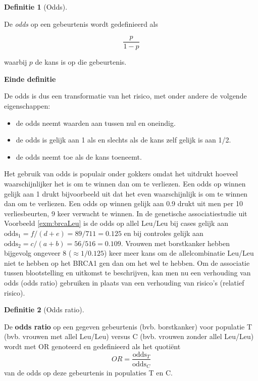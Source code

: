 \documentclass[
  12pt,dutch,coursenotes]{book}
\theoremstyle{definition}
\newtheorem{definition}{Definitie}[chapter]
\theoremstyle{definition}
\theoremstyle{definition}
\theoremstyle{definition}
\theoremstyle{remark}
\begin{document}
\begin{definition}[Odds]
\protect\hypertarget{def:unnamed-chunk-112}{}{\label{def:unnamed-chunk-112} {} }
\end{definition}
De \emph{odds} op een gebeurtenis wordt gedefinieerd als

\begin{equation*}
\frac{p}{1-p}
\end{equation*}

waarbij \(p\) de kans is op die gebeurtenis.

\textbf{Einde definitie}

De odds is dus een transformatie van het risico, met onder andere de
volgende eigenschappen:

\begin{itemize}
\item
  de odds neemt waarden aan tussen nul en oneindig.
\item
  de odds is gelijk aan 1 als en slechts als de kans zelf gelijk is aan
  1/2.
\item
  de odds neemt toe als de kans toeneemt.
\end{itemize}

Het gebruik van odds is populair onder gokkers omdat het uitdrukt hoeveel
waarschijnlijker het is om te winnen dan om te verliezen. Een odds op winnen
gelijk aan 1 drukt bijvoorbeeld uit dat het even waarschijnlijk is om te
winnen dan om te verliezen. Een odds op winnen gelijk aan 0.9 drukt uit men
per 10 verliesbeurten, 9 keer verwacht te winnen. In de genetische associatiestudie uit Voorbeeld \ref{exm:brcaLeu}
is de odds op allel Leu/Leu bij cases gelijk aan
\(\mbox{odds}_1=f/(d+e)=89/711=0.125\) en bij controles gelijk aan \(\mbox{odds}_2=c/(a+b)=56/516=0.109\). Vrouwen met borstkanker hebben bijgevolg ongeveer 8 (\(\approx 1/0.125\)) keer meer kans om de allelcombinatie Leu/Leu niet te hebben op het BRCA1 gen dan om het wel te hebben.
Om de associatie tussen blootstelling
en uitkomst te beschrijven, kan men nu een verhouding van odds (odds ratio)
gebruiken in plaats van een verhouding van risico's (relatief risico).

\begin{definition}[Odds ratio]
\protect\hypertarget{def:unnamed-chunk-113}{}{\label{def:unnamed-chunk-113} {} }
\end{definition}
De \textbf{odds ratio} op een gegeven gebeurtenis (bvb. borstkanker) voor populatie T (bvb. vrouwen met allel Leu/Leu) versus C (bvb. vrouwen zonder allel Leu/Leu) wordt met OR genoteerd en gedefinieerd als het quotiënt
\begin{equation*}
OR=\frac{\mbox{odds}_T}{\mbox{odds}_C}
\end{equation*}
van de odds op deze gebeurtenis in populaties T en C.
\end{document}
